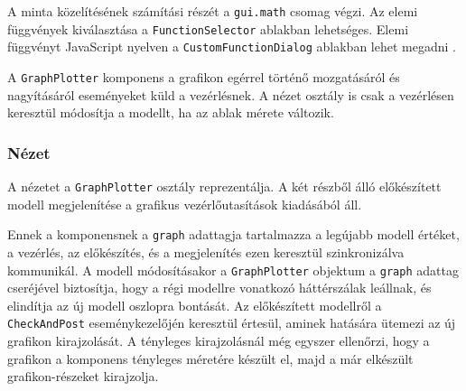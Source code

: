 A minta közelítésének számítási részét a \texttt{gui.math} csomag végzi.
Az elemi függvények kiválasztása a \texttt{FunctionSelector} ablakban lehetséges.
Elemi függvényt JavaScript nyelven a \texttt{CustomFunctionDialog} ablakban lehet megadni .

A \texttt{GraphPlotter} komponens a grafikon egérrel történő mozgatásáról és nagyításáról eseményeket küld a vezérlésnek.
A nézet osztály is csak a vezérlésen keresztül módosítja a modellt, ha az ablak mérete változik.

\subsubsection{Nézet}

A nézetet a \texttt{GraphPlotter} osztály reprezentálja.
A két részből álló előkészített modell megjelenítése a grafikus vezérlőutasítások kiadásából áll.

Ennek a komponensnek a \texttt{graph} adattagja tartalmazza a legújabb modell értéket, a vezérlés, az előkészítés, és a megjelenítés ezen keresztül szinkronizálva kommunikál.
A modell módosításakor a \texttt{GraphPlotter} objektum a \texttt{graph} adattag cseréjével biztosítja, hogy a régi modellre vonatkozó háttérszálak leállnak, és elindítja az új modell oszlopra bontását.
Az előkészített modellről a \texttt{CheckAndPost} eseménykezelőjén keresztül értesül, aminek hatására ütemezi az új grafikon kirajzolását.
A tényleges kirajzolásnál még egyszer ellenőrzi, hogy a grafikon a komponens tényleges méretére készült el, majd a már elkészült grafikon-részeket kirajzolja.

